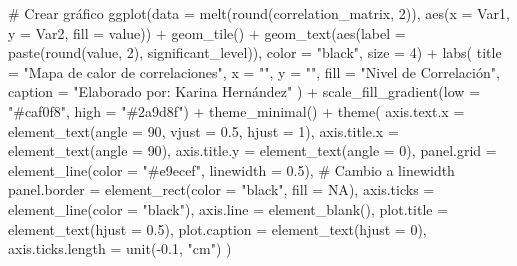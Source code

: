 \documentclass[
  10pt,
  letterpaper,
  DIV=11,
  numbers=noendperiod]{scrreprt}
\newenvironment{Shaded}{\begin{snugshade}}{\end{snugshade}}
\newcommand{\AttributeTok}[1]{\textcolor[rgb]{0.40,0.45,0.13}{#1}}
\newcommand{\CommentTok}[1]{\textcolor[rgb]{0.37,0.37,0.37}{#1}}
\newcommand{\ConstantTok}[1]{\textcolor[rgb]{0.56,0.35,0.01}{#1}}
\newcommand{\DecValTok}[1]{\textcolor[rgb]{0.68,0.00,0.00}{#1}}
\newcommand{\FloatTok}[1]{\textcolor[rgb]{0.68,0.00,0.00}{#1}}
\newcommand{\FunctionTok}[1]{\textcolor[rgb]{0.28,0.35,0.67}{#1}}
\newcommand{\NormalTok}[1]{\textcolor[rgb]{0.00,0.23,0.31}{#1}}
\newcommand{\SpecialCharTok}[1]{\textcolor[rgb]{0.37,0.37,0.37}{#1}}
\newcommand{\StringTok}[1]{\textcolor[rgb]{0.13,0.47,0.30}{#1}}
\begin{document}
\begin{Shaded}
\begin{Highlighting}[numbers=left,,]
\CommentTok{\# Crear gráfico}
\FunctionTok{ggplot}\NormalTok{(}\AttributeTok{data =} \FunctionTok{melt}\NormalTok{(}\FunctionTok{round}\NormalTok{(correlation\_matrix, }\DecValTok{2}\NormalTok{)), }\FunctionTok{aes}\NormalTok{(}\AttributeTok{x =}\NormalTok{ Var1, }\AttributeTok{y =}\NormalTok{ Var2, }\AttributeTok{fill =}\NormalTok{ value)) }\SpecialCharTok{+}
    \FunctionTok{geom\_tile}\NormalTok{() }\SpecialCharTok{+}
    \FunctionTok{geom\_text}\NormalTok{(}\FunctionTok{aes}\NormalTok{(}\AttributeTok{label =} \FunctionTok{paste}\NormalTok{(}\FunctionTok{round}\NormalTok{(value, }\DecValTok{2}\NormalTok{), significant\_level)), }\AttributeTok{color =} \StringTok{"black"}\NormalTok{, }\AttributeTok{size =} \DecValTok{4}\NormalTok{) }\SpecialCharTok{+}
    \FunctionTok{labs}\NormalTok{(}
        \AttributeTok{title =} \StringTok{"Mapa de calor de correlaciones"}\NormalTok{,}
        \AttributeTok{x =} \StringTok{""}\NormalTok{,}
        \AttributeTok{y =} \StringTok{""}\NormalTok{,}
        \AttributeTok{fill =} \StringTok{"Nivel de Correlación"}\NormalTok{,}
        \AttributeTok{caption =} \StringTok{"Elaborado por: Karina Hernández"}
\NormalTok{    ) }\SpecialCharTok{+}
    \FunctionTok{scale\_fill\_gradient}\NormalTok{(}\AttributeTok{low =} \StringTok{"\#caf0f8"}\NormalTok{, }\AttributeTok{high =} \StringTok{"\#2a9d8f"}\NormalTok{) }\SpecialCharTok{+}
    \FunctionTok{theme\_minimal}\NormalTok{() }\SpecialCharTok{+}
    \FunctionTok{theme}\NormalTok{(}
        \AttributeTok{axis.text.x =} \FunctionTok{element\_text}\NormalTok{(}\AttributeTok{angle =} \DecValTok{90}\NormalTok{, }\AttributeTok{vjust =} \FloatTok{0.5}\NormalTok{, }\AttributeTok{hjust =} \DecValTok{1}\NormalTok{),}
        \AttributeTok{axis.title.x =} \FunctionTok{element\_text}\NormalTok{(}\AttributeTok{angle =} \DecValTok{90}\NormalTok{),}
        \AttributeTok{axis.title.y =} \FunctionTok{element\_text}\NormalTok{(}\AttributeTok{angle =} \DecValTok{0}\NormalTok{),}
        \AttributeTok{panel.grid =} \FunctionTok{element\_line}\NormalTok{(}\AttributeTok{color =} \StringTok{"\#e9ecef"}\NormalTok{, }\AttributeTok{linewidth =} \FloatTok{0.5}\NormalTok{),  }\CommentTok{\# Cambio a linewidth}
        \AttributeTok{panel.border =} \FunctionTok{element\_rect}\NormalTok{(}\AttributeTok{color =} \StringTok{"black"}\NormalTok{, }\AttributeTok{fill =} \ConstantTok{NA}\NormalTok{),}
        \AttributeTok{axis.ticks =} \FunctionTok{element\_line}\NormalTok{(}\AttributeTok{color =} \StringTok{"black"}\NormalTok{),}
        \AttributeTok{axis.line =} \FunctionTok{element\_blank}\NormalTok{(),}
        \AttributeTok{plot.title =} \FunctionTok{element\_text}\NormalTok{(}\AttributeTok{hjust =} \FloatTok{0.5}\NormalTok{),}
        \AttributeTok{plot.caption =} \FunctionTok{element\_text}\NormalTok{(}\AttributeTok{hjust =} \DecValTok{0}\NormalTok{),}
        \AttributeTok{axis.ticks.length =} \FunctionTok{unit}\NormalTok{(}\SpecialCharTok{{-}}\FloatTok{0.1}\NormalTok{, }\StringTok{"cm"}\NormalTok{)}
\NormalTok{    )}
\end{Highlighting}
\end{Shaded}
\end{document}

